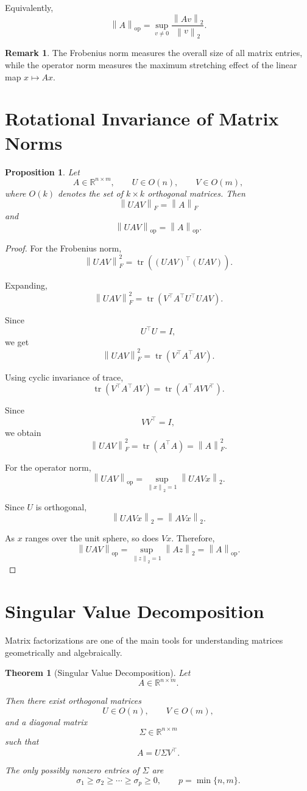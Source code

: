 \documentclass[12pt,oneside]{book}
\numberwithin{equation}{section}
\theoremstyle{definition}
\newtheorem{remark}{Remark}[section]
\theoremstyle{plain}
\newtheorem{theorem}{Theorem}[section]
\newtheorem{proposition}{Proposition}[section]
\theoremstyle{remark}
\newcommand{\R}{\mathbb{R}}
\newcommand{\norm}[1]{\left\lVert #1 \right\rVert}
\newcommand{\tr}{\operatorname{tr}}
\begin{document}
Equivalently,
\[
\norm{A}_{\mathrm{op}}
=
\sup_{v\neq 0}
\frac{\norm{Av}_2}{\norm{v}_2}.
\]

\begin{remark}
The Frobenius norm measures the overall size of all matrix entries, while the operator norm measures the maximum stretching effect of the linear map $x\mapsto Ax$.
\end{remark}

\section{Rotational Invariance of Matrix Norms}

\begin{proposition}
Let
\[
A\in\R^{n\times m},
\qquad
U\in O(n),
\qquad
V\in O(m),
\]
where $O(k)$ denotes the set of $k\times k$ orthogonal matrices. Then
\[
\norm{UAV}_F=\norm{A}_F
\]
and
\[
\norm{UAV}_{\mathrm{op}}=\norm{A}_{\mathrm{op}}.
\]
\end{proposition}

\begin{proof}
For the Frobenius norm,
\[
\norm{UAV}_F^2
=
\tr((UAV)^\top(UAV)).
\]

Expanding,
\[
\norm{UAV}_F^2
=
\tr(V^\top A^\top U^\top U A V).
\]

Since
\[
U^\top U=I,
\]
we get
\[
\norm{UAV}_F^2
=
\tr(V^\top A^\top A V).
\]

Using cyclic invariance of trace,
\[
\tr(V^\top A^\top A V)
=
\tr(A^\top A VV^\top).
\]

Since
\[
VV^\top=I,
\]
we obtain
\[
\norm{UAV}_F^2
=
\tr(A^\top A)
=
\norm{A}_F^2.
\]

For the operator norm,
\[
\norm{UAV}_{\mathrm{op}}
=
\sup_{\norm{x}_2=1}
\norm{UAVx}_2.
\]

Since $U$ is orthogonal,
\[
\norm{UAVx}_2
=
\norm{AVx}_2.
\]

As $x$ ranges over the unit sphere, so does $Vx$. Therefore,
\[
\norm{UAV}_{\mathrm{op}}
=
\sup_{\norm{z}_2=1}
\norm{Az}_2
=
\norm{A}_{\mathrm{op}}.
\]
\end{proof}

\section{Singular Value Decomposition}

Matrix factorizations are one of the main tools for understanding matrices geometrically and algebraically.

\begin{theorem}[Singular Value Decomposition]
Let
\[
A\in\R^{n\times m}.
\]

Then there exist orthogonal matrices
\[
U\in O(n),
\qquad
V\in O(m),
\]
and a diagonal matrix
\[
\Sigma\in\R^{n\times m}
\]
such that
\[
A=U\Sigma V^\top.
\]

The only possibly nonzero entries of $\Sigma$ are
\[
\sigma_1\geq \sigma_2\geq \cdots \geq \sigma_p\geq 0,
\qquad
p=\min\{n,m\}.
\]
\end{theorem}
\end{document}
